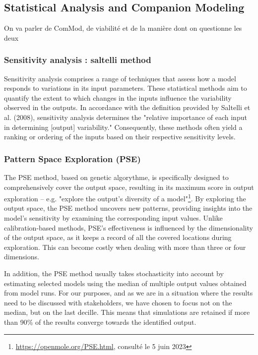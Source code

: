 \documentclass{article}
\begin{document}
\subsection{Statistical Analysis and Companion Modeling}

On va parler de ComMod, de viabilité et de la manière dont on questionne les deux

    \subsubsection{Sensitivity analysis : saltelli method}

    Sensitivity analysis comprises a range of techniques that assess how a model responds to variations in its input parameters. These statistical methods aim to quantify the extent to which changes in the inputs influence the variability observed in the outputs. In accordance with the definition provided by Saltelli et al. (2008)\cite{saltelli_global_2008}, sensitivity analysis determines the "relative importance of each input in determining [output] variability." Consequently, these methods often yield a ranking or ordering of the inputs based on their respective sensitivity levels.\\

    \subsubsection{Pattern Space Exploration (PSE)}
    The PSE \cite{cherel_beyond_2015}  method, based on genetic algorythme, is specifically designed to comprehensively cover the output space, resulting in its maximum score in output exploration -- e.g. "explore the output's diversity of a model"\footnote{\url{https://openmole.org/PSE.html}, consulté le 5 juin 2023}. By exploring the output space, the PSE method uncovers new patterns, providing insights into the model's sensitivity by examining the corresponding input values. Unlike calibration-based methods, PSE's effectiveness is influenced by the dimensionality of the output space, as it keeps a record of all the covered locations during exploration. This can become costly when dealing with more than three or four dimensions.

    In addition, the PSE method usually takes stochasticity into account by estimating selected models using the median of multiple output values obtained from model runs. For our purposes, and as we are in a situation where the results need to be discussed with stakeholders, we have chosen to focus not on the median, but on the last decille. This means that simulations are retained if more than 90\% of the results converge towards the identified output.
\end{document}
